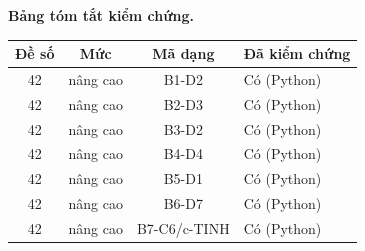 \documentclass[12pt,a4paper]{article}
\newif\ifloigiai \loigiaitrue   %
\begin{document}
\ifloigiai
\begin{samepage}\bigskip\noindent\textbf{Bảng tóm tắt kiểm chứng.}\par\smallskip
{\small\begin{tabular}{|c|c|c|l|}
\hline Đề số & Mức & Mã dạng & Đã kiểm chứng\\\hline
42 & nâng cao & B1-D2 & Có (Python) \\\hline
42 & nâng cao & B2-D3 & Có (Python) \\\hline
42 & nâng cao & B3-D2 & Có (Python) \\\hline
42 & nâng cao & B4-D4 & Có (Python) \\\hline
42 & nâng cao & B5-D1 & Có (Python) \\\hline
42 & nâng cao & B6-D7 & Có (Python) \\\hline
42 & nâng cao & B7-C6/c-TINH & Có (Python) \\\hline
\end{tabular}}
\end{samepage}
\fi
\end{document}
